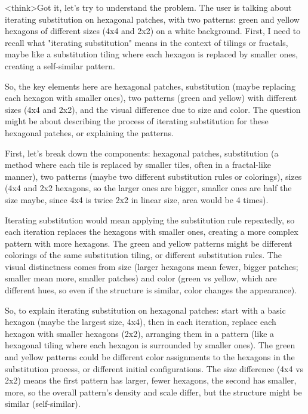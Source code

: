 <think>Got it, let's try to understand the problem. The user is talking about iterating substitution on hexagonal patches, with two patterns: green and yellow hexagons of different sizes (4x4 and 2x2) on a white background. First, I need to recall what "iterating substitution" means in the context of tilings or fractals, maybe like a substitution tiling where each hexagon is replaced by smaller ones, creating a self-similar pattern. 

So, the key elements here are hexagonal patches, substitution (maybe replacing each hexagon with smaller ones), two patterns (green and yellow) with different sizes (4x4 and 2x2), and the visual difference due to size and color. The question might be about describing the process of iterating substitution for these hexagonal patches, or explaining the patterns.

First, let's break down the components: hexagonal patches, substitution (a method where each tile is replaced by smaller tiles, often in a fractal-like manner), two patterns (maybe two different substitution rules or colorings), sizes (4x4 and 2x2 hexagons, so the larger ones are bigger, smaller ones are half the size maybe, since 4x4 is twice 2x2 in linear size, area would be 4 times). 

Iterating substitution would mean applying the substitution rule repeatedly, so each iteration replaces the hexagons with smaller ones, creating a more complex pattern with more hexagons. The green and yellow patterns might be different colorings of the same substitution tiling, or different substitution rules. The visual distinctness comes from size (larger hexagons mean fewer, bigger patches; smaller mean more, smaller patches) and color (green vs yellow, which are different hues, so even if the structure is similar, color changes the appearance).

So, to explain iterating substitution on hexagonal patches: start with a basic hexagon (maybe the largest size, 4x4), then in each iteration, replace each hexagon with smaller hexagons (2x2), arranging them in a pattern (like a hexagonal tiling where each hexagon is surrounded by smaller ones). The green and yellow patterns could be different color assignments to the hexagons in the substitution process, or different initial configurations. The size difference (4x4 vs 2x2) means the first pattern has larger, fewer hexagons, the second has smaller, more, so the overall pattern's density and scale differ, but the structure might be similar (self-similar).

